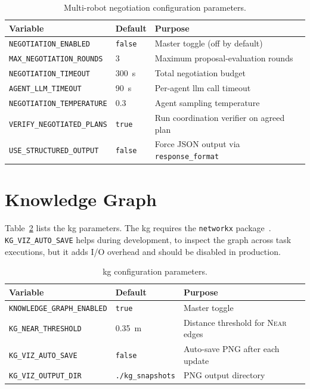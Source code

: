 \begin{table}[t]
	\centering
	\begin{tabular}{lll}
		\toprule
		\textbf{Variable}                  & \textbf{Default} & \textbf{Purpose}                                \\
		\midrule
		\texttt{NEGOTIATION\_ENABLED}      & \texttt{false}   & Master toggle (off by default)                  \\
		\texttt{MAX\_NEGOTIATION\_ROUNDS}  & 3                & Maximum proposal-evaluation rounds              \\
		\texttt{NEGOTIATION\_TIMEOUT}      & 300~s            & Total negotiation budget                        \\
		\texttt{AGENT\_LLM\_TIMEOUT}       & 90~s             & Per-agent \gls{llm} call timeout                \\
		\texttt{NEGOTIATION\_TEMPERATURE}  & 0.3              & Agent sampling temperature                      \\
		\texttt{VERIFY\_NEGOTIATED\_PLANS} & \texttt{true}    & Run coordination verifier on agreed plan        \\
		\texttt{USE\_STRUCTURED\_OUTPUT}   & \texttt{false}   & Force JSON output via \texttt{response\_format} \\
		\bottomrule
	\end{tabular}
	\caption{Multi-robot negotiation configuration parameters.}
	\label{tab:config_negotiation}
\end{table}

\section{Knowledge Graph}\label{appendix:config:kg}
Table~\ref{tab:config_kg} lists the \gls{kg} parameters. The \gls{kg} requires the \texttt{networkx} package~\cite{hagberg2008networkx}. \texttt{KG\_VIZ\_AUTO\_SAVE} helps during development, to inspect the graph across task executions, but it adds I/O overhead and should be disabled in production.

\begin{table}[t]
	\centering
	\begin{tabular}{lll}
		\toprule
		\textbf{Variable}                  & \textbf{Default}         & \textbf{Purpose}                           \\
		\midrule
		\texttt{KNOWLEDGE\_GRAPH\_ENABLED} & \texttt{true}            & Master toggle                              \\
		\texttt{KG\_NEAR\_THRESHOLD}       & 0.35~m                   & Distance threshold for \textsc{Near} edges \\
		\texttt{KG\_VIZ\_AUTO\_SAVE}       & \texttt{false}           & Auto-save PNG after each update            \\
		\texttt{KG\_VIZ\_OUTPUT\_DIR}      & \texttt{./kg\_snapshots} & PNG output directory                       \\
		\bottomrule
	\end{tabular}
	\caption{\gls{kg} configuration parameters.}
	\label{tab:config_kg}
\end{table}

